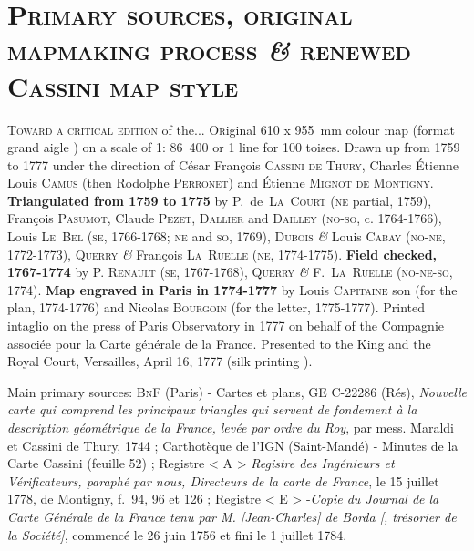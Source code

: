 \documentclass[portrait, A0]{sciposter}
\begin{document}
\vspace{-1cm}
\begin{minipage}[b]{\textwidth}
  \section{\normalfont \textsc{Primary sources, original mapmaking process \textit{\&} renewed Cassini map style}}
  \begin{multicols}{3}
    \setlength{\columnsep}{80pt}
\textsc{Toward a critical edition} \small{of the...}
\vfill
\normalsize
\lettrine{O}riginal 610 x 955~mm colour map (format \og grand aigle \fg) on a scale of 1: 86~400 or 1 line for 100 toises. Drawn up from 1759 to 1777 under the direction of César François \textsc{Cassini de Thury}, Charles Étienne Louis \textsc{Camus} (then Rodolphe \textsc{Perronet}) and Étienne \textsc{Mignot de Montigny}. \textbf{Triangulated from 1759 to 1775} by P.~de~\textsc{La~Court} (\textsc{ne} partial, 1759), François \textsc{Pasumot}, Claude \textsc{Pezet}, \textsc{Dallier} and \textsc{Dailley} (\textsc{no-so}, c. 1764-1766), Louis \textsc{Le~Bel} (\textsc{se}, 1766-1768; \textsc{ne} and \textsc{so}, 1769), \textsc{Dubois} \textit{\&} Louis \textsc{Cabay} (\textsc{no-ne}, 1772-1773), Q\textsc{uerry} \textit{\&} François \textsc{La~Ruelle} (\textsc{ne}, 1774-1775). \textbf{Field checked, 1767-1774} by P. \textsc{Renault} (\textsc{se}, 1767-1768), Q\textsc{uerry} \textit{\&} F.~\textsc{La~Ruelle} (\textsc{no-ne-so}, 1774). \textbf{Map engraved in Paris in 1774-1777} by Louis \textsc{Capitaine} son (for the plan, 1774-1776) and Nicolas \textsc{Bourgoin} (for the letter, 1775-1777). Printed intaglio on the press of Paris Observatory in 1777 on behalf of the Compagnie associée pour la Carte générale de la France. Presented to the King and the Royal Court, Versailles, April 16, 1777 (\og silk printing \fg).\\
\vfill


\scriptsize Main primary sources: \textsc{BnF} (Paris) - Cartes et plans, GE C-22286 (Rés), \textit{Nouvelle carte qui comprend les principaux triangles qui servent de fondement à la description géométrique de la France, levée par ordre du Roy}, par mess. Maraldi et Cassini de Thury, 1744 ; Carthotèque de l'IGN (Saint-Mandé) - Minutes de la Carte Cassini (feuille 52) ; Registre < A > \textit{Registre des Ingénieurs et Vérificateurs, paraphé par nous, Directeurs de la carte de France}, le 15 juillet 1778, de Montigny, f.~94, 96 et 126 ; Registre  < E > -\textit{Copie du Journal de la Carte Générale de la France tenu par M. [Jean-Charles] de Borda [, trésorier de la Société]}, commencé le 26 juin 1756 et fini le 1 juillet 1784.


\end{multicols}
\end{minipage}
\end{document}
